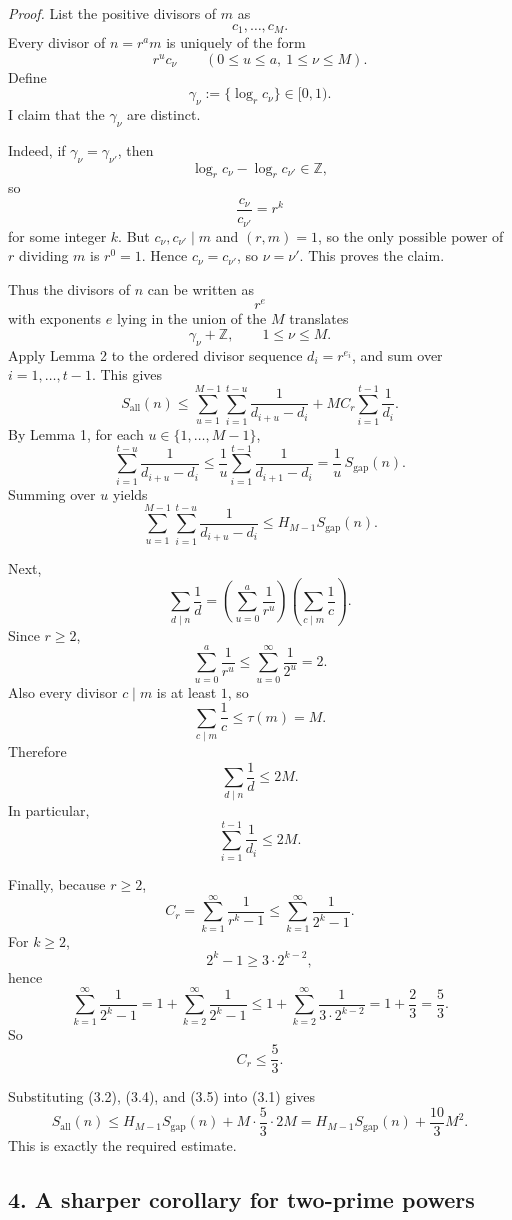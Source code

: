 \emph{Proof.}
List the positive divisors of \(m\) as
\[
c_1,\dots,c_M.
\]
Every divisor of \(n=r^a m\) is uniquely of the form
\[
r^u c_\nu
\qquad (0\leq u\leq a,\ 1\leq \nu\leq M).
\]
Define
\[
\gamma_\nu:=\{\log_r c_\nu\}\in [0,1).
\]
I claim that the \(\gamma_\nu\) are distinct.

Indeed, if \(\gamma_\nu=\gamma_{\nu'}\), then
\[
\log_r c_\nu-\log_r c_{\nu'}\in \mathbb Z,
\]
so
\[
\frac{c_\nu}{c_{\nu'}}=r^k
\]
for some integer \(k\). But \(c_\nu,c_{\nu'}\mid m\) and \((r,m)=1\), so the only possible power of \(r\) dividing \(m\) is \(r^0=1\). Hence \(c_\nu=c_{\nu'}\), so \(\nu=\nu'\). This proves the claim.

Thus the divisors of \(n\) can be written as
\[
r^e
\]
with exponents \(e\) lying in the union of the \(M\) translates
\[
\gamma_\nu+\mathbb Z,
\qquad 1\leq \nu\leq M.
\]
Apply Lemma 2 to the ordered divisor sequence \(d_i=r^{e_i}\), and sum over \(i=1,\dots,t-1\). This gives
\[
S_{\mathrm{all}}(n)
\leq
\sum_{u=1}^{M-1}\sum_{i=1}^{t-u}\frac{1}{d_{i+u}-d_i}
+
M C_r\sum_{i=1}^{t-1}\frac{1}{d_i}.
\tag{3.1}
\]
By Lemma 1, for each \(u\in\{1,\dots,M-1\}\),
\[
\sum_{i=1}^{t-u}\frac{1}{d_{i+u}-d_i}
\leq
\frac1u \sum_{i=1}^{t-1}\frac{1}{d_{i+1}-d_i}
=
\frac1u\,S_{\mathrm{gap}}(n).
\]
Summing over \(u\) yields
\[
\sum_{u=1}^{M-1}\sum_{i=1}^{t-u}\frac{1}{d_{i+u}-d_i}
\leq
H_{M-1} S_{\mathrm{gap}}(n).
\tag{3.2}
\]

Next,
\[
\sum_{d\mid n}\frac1d
=
\left(\sum_{u=0}^{a}\frac{1}{r^u}\right)\left(\sum_{c\mid m}\frac1c\right).
\]
Since \(r\geq 2\),
\[
\sum_{u=0}^{a}\frac1{r^u}\leq \sum_{u=0}^{\infty}\frac1{2^u}=2.
\]
Also every divisor \(c\mid m\) is at least \(1\), so
\[
\sum_{c\mid m}\frac1c \leq \tau(m)=M.
\]
Therefore
\[
\sum_{d\mid n}\frac1d \leq 2M.
\tag{3.3}
\]
In particular,
\[
\sum_{i=1}^{t-1}\frac1{d_i}\leq 2M.
\tag{3.4}
\]

Finally, because \(r\geq 2\),
\[
C_r=\sum_{k=1}^{\infty}\frac{1}{r^k-1}
\leq
\sum_{k=1}^{\infty}\frac{1}{2^k-1}.
\]
For \(k\geq 2\),
\[
2^k-1\geq 3\cdot 2^{k-2},
\]
hence
\[
\sum_{k=1}^{\infty}\frac{1}{2^k-1}
=
1+\sum_{k=2}^{\infty}\frac{1}{2^k-1}
\leq
1+\sum_{k=2}^{\infty}\frac{1}{3\cdot 2^{k-2}}
=
1+\frac23
=
\frac53.
\]
So
\[
C_r\leq \frac53.
\tag{3.5}
\]

Substituting (3.2), (3.4), and (3.5) into (3.1) gives
\[
S_{\mathrm{all}}(n)
\leq
H_{M-1}S_{\mathrm{gap}}(n)+M\cdot \frac53\cdot 2M
=
H_{M-1}S_{\mathrm{gap}}(n)+\frac{10}{3}M^2.
\]
This is exactly the required estimate.

\subsection*{4. A sharper corollary for two-prime powers}

